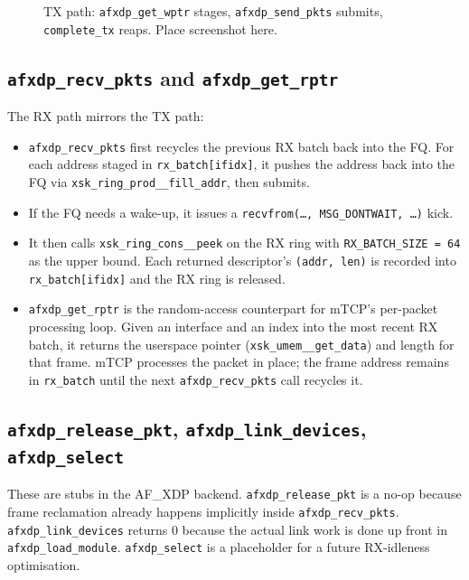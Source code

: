 \documentclass[10pt, letterpaper, twocolumn]{article}
\begin{document}
\begin{figure}[htbp]
    \centering
    \caption{TX path: \texttt{afxdp\_get\_wptr} stages, \texttt{afxdp\_send\_pkts} submits, \texttt{complete\_tx} reaps. Place screenshot here.}
    \label{fig:send_path}
\end{figure}
\FloatBarrier

\subsection{\texttt{afxdp\_recv\_pkts} and \texttt{afxdp\_get\_rptr}}

The RX path mirrors the TX path:
\begin{itemize}
    \item \texttt{afxdp\_recv\_pkts} first recycles the previous RX batch back into the FQ. For each address staged in \texttt{rx\_batch[ifidx]}, it pushes the address back into the FQ via \texttt{xsk\_ring\_prod\_\_fill\_addr}, then submits.
    \item If the FQ needs a wake-up, it issues a \texttt{recvfrom(\dots, MSG\_DONTWAIT, \dots)} kick.
    \item It then calls \texttt{xsk\_ring\_cons\_\_peek} on the RX ring with \texttt{RX\_BATCH\_SIZE = 64} as the upper bound. Each returned descriptor's \texttt{(addr, len)} is recorded into \texttt{rx\_batch[ifidx]} and the RX ring is released.
    \item \texttt{afxdp\_get\_rptr} is the random-access counterpart for mTCP's per-packet processing loop. Given an interface and an index into the most recent RX batch, it returns the userspace pointer (\texttt{xsk\_umem\_\_get\_data}) and length for that frame. mTCP processes the packet in place; the frame address remains in \texttt{rx\_batch} until the next \texttt{afxdp\_recv\_pkts} call recycles it.
\end{itemize}

\subsection{\texttt{afxdp\_release\_pkt}, \texttt{afxdp\_link\_devices}, \texttt{afxdp\_select}}

These are stubs in the AF\_XDP backend. \texttt{afxdp\_release\_pkt} is a no-op because frame reclamation already happens implicitly inside \texttt{afxdp\_recv\_pkts}. \texttt{afxdp\_link\_devices} returns 0 because the actual link work is done up front in \texttt{afxdp\_load\_module}. \texttt{afxdp\_select} is a placeholder for a future RX-idleness optimisation.
\end{document}
